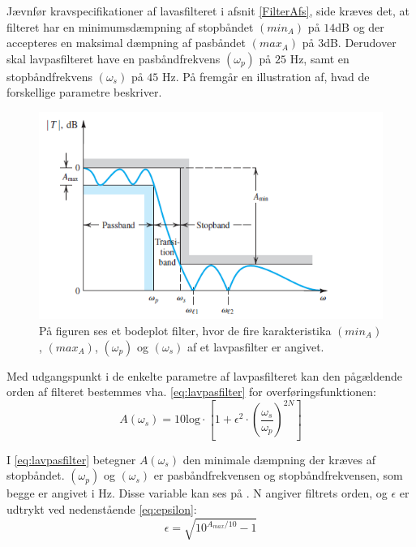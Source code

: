 Jævnfør kravspecifikationer af lavasfilteret i afsnit \ref{FilterAfs}, side \pageref{FilterAfs} kræves det, at filteret har en minimumsdæmpning af stopbåndet $(min_{A})$ på $14$dB og der accepteres en maksimal dæmpning af pasbåndet $(max_{A})$ på $3$dB. Derudover skal lavpasfilteret have en pasbåndfrekvens $(\omega_p)$ på $25$ Hz, samt en stopbåndfrekvens $(\omega_s)$ på $45$ Hz. På  fremgår en illustration af, hvad de forskellige parametre beskriver.

\begin{figure}[H]
	\centering
	\includegraphics[scale=1]{figures/cProblemloesning/Lavpasfilter_generisk.PNG}
	\caption{På figuren ses et bodeplot filter, hvor de fire karakteristika $(min_{A})$, $(max_{A})$, $(\omega_p)$ og $(\omega_s)$ af et lavpasfilter er angivet. \cite{Carter2013}}
	\label{fig:Lavpasfilter_generisk}
\end{figure}
\noindent Med udgangspunkt i de enkelte parametre af lavpasfilteret kan den pågældende orden af filteret bestemmes vha. \eqref{eq:lavpasfilter} for overføringsfunktionen:
\begin{equation} \label{eq:lavpasfilter}
A(\omega_s) = 10 \text{log} \cdot \left[1 + \epsilon^2 \cdot (\frac{\omega _s}{\omega _p})^{2N}\right] 
\end{equation}

\noindent I \eqref{eq:lavpasfilter} betegner $A(\omega _s)$ den minimale dæmpning der kræves af stopbåndet. $(\omega_p)$ og $(\omega_s)$ er pasbåndfrekvensen og stopbåndfrekvensen, som begge er angivet i Hz. Disse variable kan ses på . N angiver filtrets orden, og $\epsilon$ er udtrykt ved nedenstående \eqref{eq:epsilon}:
\begin{equation}\label{eq:epsilon}
\epsilon = \sqrt{10^{A_{max} / 10} -1}
\end{equation}

